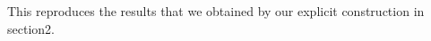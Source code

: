 \documentclass[12pt]{article}
\theoremstyle{definition}
\newcommand{\be}{\begin{equation}}
\newcommand{\ee}{\end{equation}}
\begin{document}
This reproduces the results that we obtained by our explicit construction in section2.

\end{document}
